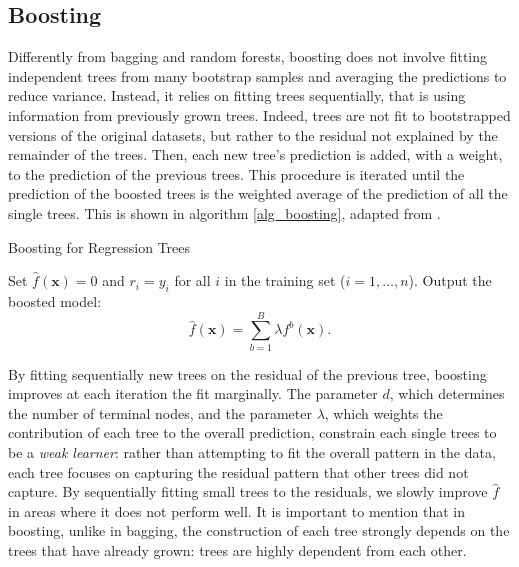 \documentclass[a4paper,11pt]{article}
\begin{document}
\subsection{Boosting}

Differently from bagging and random forests, boosting does not involve fitting independent trees from many bootstrap samples and averaging the predictions to reduce variance. Instead, it relies on fitting trees sequentially, that is using information from previously grown trees. Indeed, trees are not fit to bootstrapped versions of the original datasets, but rather to the residual not explained by the remainder of the trees. Then, each new tree's prediction is added, with a weight, to the prediction of the previous trees. This procedure is iterated until the prediction of the boosted trees is the weighted average of the prediction of all the single trees.
This is shown in algorithm \ref{alg_boosting}, adapted from \cite{jamesIntroductionStatisticalLearning2021}.
\begin{algorithm} [h]
  \caption{Boosting for Regression Trees}
  \label{alg_boosting}
  \SetAlgoLined
  \DontPrintSemicolon
  
  Set $\hat{f}(\mathbf{x}) = 0$ and $r_i = y_i$ for all $i$ in the training set ($i= 1, \ldots, n$).\;
  Output the boosted model:
  \begin{equation}
  \hat{f}(\mathbf{x}) = \sum_{b=1}^B \lambda f^b(\mathbf{x}).
  \end{equation}\;
  
\end{algorithm}

By fitting sequentially new trees on the residual of the previous tree, boosting improves at each iteration the fit marginally. The parameter $d$, which determines the number of terminal nodes, and the parameter $\lambda$, which weights the contribution of each tree to the overall prediction, constrain each single trees to be a \textit{weak learner}: rather than attempting to fit the overall pattern in the data, each tree focuses on capturing the residual pattern that other trees did not capture. By sequentially fitting small trees to the residuals, we slowly improve $\hat{f}$ in areas where it
does not perform well. It is important to mention that in boosting, unlike in bagging, the construction of each tree strongly depends on the trees that have already grown: trees are highly dependent from each other.
\end{document}
